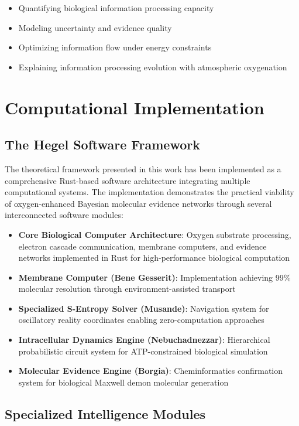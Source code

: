 \documentclass[12pt,a4paper]{article}
\begin{document}
\begin{itemize}
\item Quantifying biological information processing capacity
\item Modeling uncertainty and evidence quality
\item Optimizing information flow under energy constraints
\item Explaining information processing evolution with atmospheric oxygenation
\end{itemize}

\section{Computational Implementation}

\subsection{The Hegel Software Framework}

The theoretical framework presented in this work has been implemented as a comprehensive Rust-based software architecture integrating multiple computational systems. The implementation demonstrates the practical viability of oxygen-enhanced Bayesian molecular evidence networks through several interconnected software modules:

\begin{itemize}
\item \textbf{Core Biological Computer Architecture}: Oxygen substrate processing, electron cascade communication, membrane computers, and evidence networks implemented in Rust for high-performance biological computation
\item \textbf{Membrane Computer (Bene Gesserit)}: Implementation achieving 99\% molecular resolution through environment-assisted transport
\item \textbf{Specialized S-Entropy Solver (Musande)}: Navigation system for oscillatory reality coordinates enabling zero-computation approaches
\item \textbf{Intracellular Dynamics Engine (Nebuchadnezzar)}: Hierarchical probabilistic circuit system for ATP-constrained biological simulation
\item \textbf{Molecular Evidence Engine (Borgia)}: Cheminformatics confirmation system for biological Maxwell demon molecular generation
\end{itemize}

\subsection{Specialized Intelligence Modules}
\end{document}
